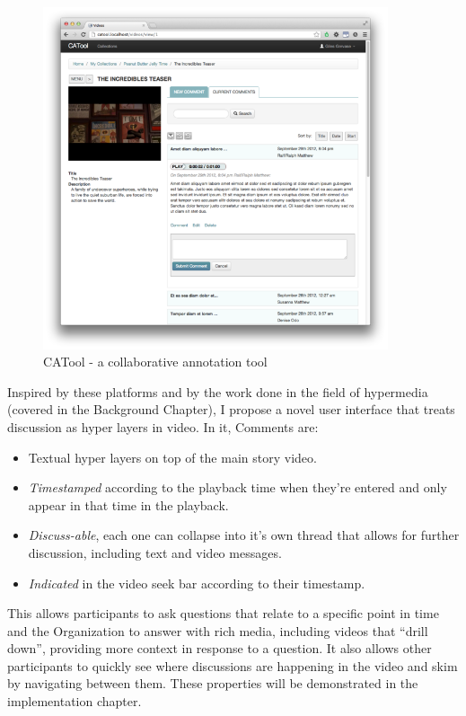    \begin{figure}[thpb]
      \centering
      \includegraphics[width=4in]{figures/catool.png}
      \caption{CATool\cite{catool} - a collaborative annotation tool}
      \label{fig_catool}
   \end{figure}

Inspired by these platforms and by the work done in the field of hypermedia (covered in the Background Chapter), I propose a novel user interface that treats discussion as hyper layers in video. In it, Comments are: 

\begin{itemize}

\item Textual hyper layers on top of the main story video. 

\item \textit{Timestamped} according to the playback time when they're entered and only appear in that time in the playback. 

\item \textit{Discuss-able}, each one can collapse into it's own thread that allows for further discussion, including text and video messages. 

\item \textit{Indicated} in the video seek bar according to their timestamp.

\end{itemize}

This allows participants to ask questions that relate to a specific point in time and the Organization to answer with rich media, including videos that “drill down”, providing more context in response to a question. It also allows other participants to quickly see where discussions are happening in the video and skim by navigating between them. These properties will be demonstrated in the implementation chapter.

